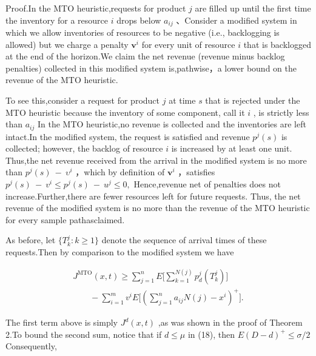 Proof.In the MTO heuristic,requests for product \(j\) are filled up
until the first time the inventory for a resource \(i\) drops below
\(a _ { i j }\) 、Consider a modified system in which we allow
inventories of resources to be negative (i.e., backlogging is allowed)
but we charge a penalty \(\boldsymbol { v } ^ { i }\) for every unit of
resource \(i\) that is backlogged at the end of the horizon.We claim the
net revenue (revenue minus backlog penalties) collected in this modified
system is,pathwise，a lower bound on the revenue of the MTO heuristic.

To see this,consider a request for product \(j\) at time \(s\) that is
rejected under the MTO heuristic because the inventory of some
component, call it \(i\) , is strictly less than \(a _ { i j }\) In the
MTO heuristic,no revenue is collected and the inventories are left
intact.In the modified system, the request is satisfied and revenue
\(p ^ { j } ( s )\) is collected; however, the backlog of resource \(i\)
is increased by at least one unit. Thus,the net revenue received from
the arrival in the modified system is no more than
\(p ^ { j } ( s ) \ - \ \upsilon ^ { i }\) ，which by definition of
\(\boldsymbol { v } ^ { i }\) ，satisfies
\(p ^ { j } ( s ) ~ - ~ v ^ { i } \leqslant p ^ { j } ( s ) ~ - ~ u ^ { j } \leqslant 0 ,\)
Hence,revenue net of penalties does not increase.Further,there are fewer
resources left for future requests. Thus, the net revenue of the
modified system is no more than the revenue of the MTO heuristic for
every sample pathasclaimed.

As before, let \(\{ T _ { k } ^ { j } \colon k \geqslant 1 \}\) denote
the sequence of arrival times of these requests.Then by comparison to
the modified system we have

\[
\begin{array} { c } { { \displaystyle { J ^ { \mathrm { M T O } } ( x , t ) \geqslant \sum _ { j = 1 } ^ { n } E \Bigg [ \sum _ { k = 1 } ^ { N ( j ) } p _ { d } ^ { j } ( T _ { k } ^ { j } ) \Bigg ] } } } \\ { { \displaystyle { \qquad - \sum _ { i = 1 } ^ { m } v ^ { i } E \Bigg [ \left( \sum _ { j = 1 } ^ { n } a _ { i j } N ( j ) - x ^ { i } \right) ^ { + } \Bigg ] . } } } \end{array}
\]

The first term above is simply \(J ^ { d } ( x , t )\) ,as was shown in
the proof of Theorem 2.To bound the second sum, notice that if
\(d \leqslant \mu\) in (18), then
\(E ( D - d ) ^ { + } \leqslant \sigma / 2\) Consequently,

